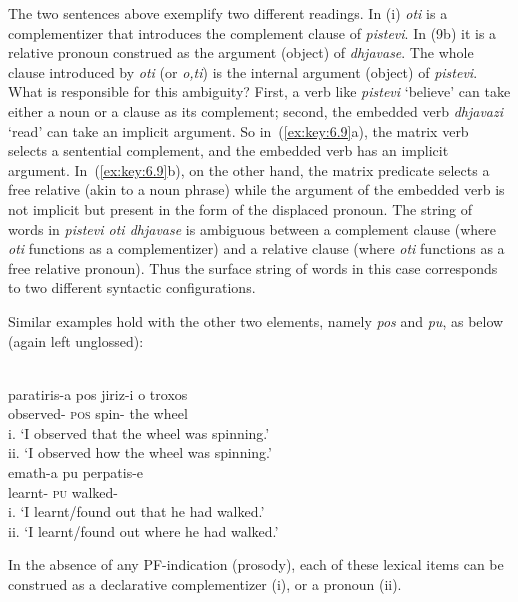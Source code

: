 \documentclass[output=paper]{langsci/langscibook}
\begin{document}
The two sentences above exemplify two different readings. In (i) \emph{oti} is
a complementizer that introduces the complement clause of \emph{pistevi}. In
(9b) it is a relative pronoun construed as the argument (object) of
\emph{dhjavase}. The whole clause introduced by \emph{oti} (or \emph{o,ti}) is
the internal argument (object) of \emph{pistevi}. What is responsible for this
ambiguity? First, a verb like \emph{pistevi} \enquote*{believe} can take either a noun
or a clause as its complement; second, the embedded verb \emph{dhjavazi}
\enquote*{read} can take an implicit argument. So in~(\ref{ex:key:6.9}a), the matrix verb
selects a sentential complement, and the embedded verb has an implicit
argument. In~(\ref{ex:key:6.9}b), on the other hand, the matrix predicate selects a free
relative (akin to a noun phrase) while the argument of the embedded verb is not
implicit but present in the form of the displaced pronoun. The string of words
in \emph{pistevi oti dhjavase} is ambiguous between a complement clause (where
\emph{oti} functions as a complementizer) and a relative clause (where
\emph{oti} functions as a free relative pronoun). Thus the surface string of
words in this case corresponds to two different syntactic configurations.

Similar examples hold with the other two elements, namely \emph{pos} and
\emph{pu}, as below (again left unglossed):

\ea\label{ex:key:6.10} \\
	\gll paratiris-a  pos jiriz-i o troxos\\
		observed-\Fsg{} \textsc{pos} spin-\Tsg{} the wheel\\
	\glt i.  \enquote*{I observed that the wheel was spinning.}\\
		ii.  \enquote*{I observed how the wheel was spinning.}
\ex\label{ex:key:6.11} \\
    \gll    emath-a pu perpatis-e\\
            learnt-\Fsg{} \textsc{pu} walked-\Tsg{}  \\
	\glt    i.  \enquote*{I learnt/found out that he had walked.}\\
		    ii.  \enquote*{I learnt/found out where he had walked.}
\z

In the absence of any PF-indication (prosody), each of these lexical items can
be construed as a declarative complementizer (i), or a
pronoun (ii).
\end{document}
